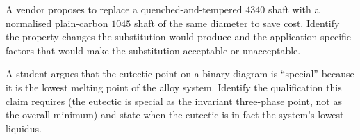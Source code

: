 \begin{exercise}
A vendor proposes to replace a quenched-and-tempered $4340$ shaft
with a normalised plain-carbon $1045$ shaft of the same diameter to
save cost. Identify the property changes the substitution would
produce and the application-specific factors that would make the
substitution acceptable or unacceptable.
\end{exercise}

\begin{exercise}
A student argues that the eutectic point on a binary diagram is
``special'' because it is the lowest melting point of the alloy
system. Identify the qualification this claim requires (the eutectic
is special as the invariant three-phase point, not as the overall
minimum) and state when the eutectic is in fact the system's lowest
liquidus.
\end{exercise}
